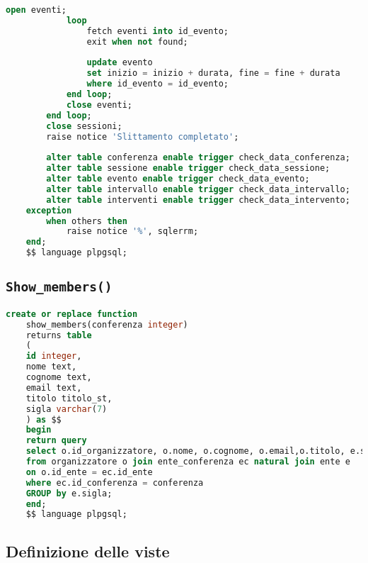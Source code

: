 \begin{lstlisting}[language=SQL, style=mystyle]
			open eventi;
			loop
				fetch eventi into id_evento;
				exit when not found;
	
				update evento
				set inizio = inizio + durata, fine = fine + durata
				where id_evento = id_evento;
			end loop;
			close eventi;
		end loop;
		close sessioni;
		raise notice 'Slittamento completato';
	
		alter table conferenza enable trigger check_data_conferenza;
		alter table sessione enable trigger check_data_sessione;
		alter table evento enable trigger check_data_evento;
		alter table intervallo enable trigger check_data_intervallo;
		alter table interventi enable trigger check_data_intervento;
	exception
		when others then
			raise notice '%', sqlerrm;
	end;
	$$ language plpgsql;
\end{lstlisting}

\subsection{\texttt{Show\_members()}}
\begin{lstlisting}[language=SQL, style=mystyle]
	create or replace function 
	show_members(conferenza integer)
	returns table 
	(
	id integer, 
	nome text, 
	cognome text, 
	email text,
	titolo titolo_st, 
	sigla varchar(7)
	) as $$
	begin
	return query
	select o.id_organizzatore, o.nome, o.cognome, o.email,o.titolo, e.sigla
	from organizzatore o join ente_conferenza ec natural join ente e  
	on o.id_ente = ec.id_ente
	where ec.id_conferenza = conferenza
	GROUP by e.sigla;
	end;
	$$ language plpgsql;
\end{lstlisting}
\subsection{Definizione delle viste}
